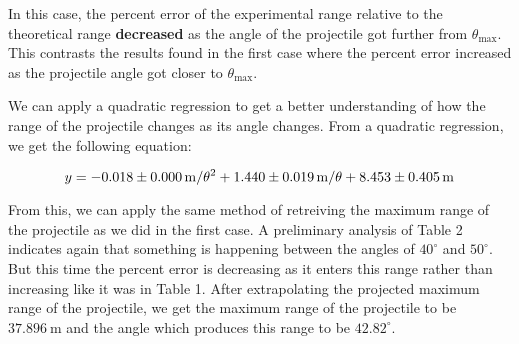 \documentclass[12pt]{article}
\begin{document}
In this case, the percent error of the experimental range relative to the theoretical range \textbf{decreased} as the angle of the projectile got further from $\theta_\text{max}$. This contrasts the results found in the first case where the percent error increased as the projectile angle got closer to $\theta_\text{max}$.

We can apply a quadratic regression to get a better understanding of how the range of the projectile changes as its angle changes. From a quadratic regression, we get the following equation:




\[ y=-0.018 \pm \SI{0.000}{\metre\per\theta\squared}+1.440 \pm \SI{0.019}{\metre\per\theta}+8.453 \pm \SI{0.405}{\metre}\]

From this, we can apply the same method of retreiving the maximum range of the projectile as we did in the first case. A preliminary analysis of Table 2 indicates again that something is happening between the angles of $40^\circ$ and $50^\circ$. But this time the percent error is decreasing as it enters this range rather than increasing like it was in Table 1. After extrapolating the projected maximum range of the projectile, we get the maximum range of the projectile to be $\SI{37.896}{\metre}$ and the angle  which produces this range to be $42.82^\circ$.
\end{document}
